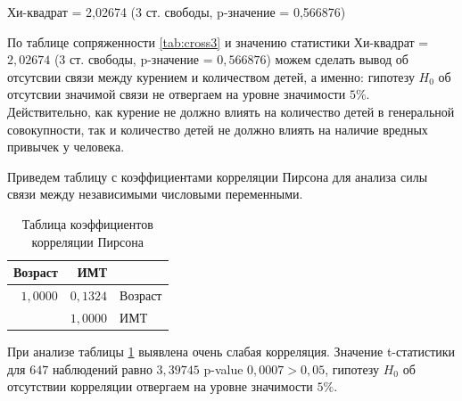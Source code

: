 \documentclass[a4paper,12pt]{article}
\begin{document}
Хи-квадрат = 2,02674 (3 ст. свободы, p-значение = 0,566876)

По таблице сопряженности \ref{tab:cross3} и значению статистики Хи-квадрат = $2,02674$ (3 ст. свободы, p-значение = $0,566876$) можем сделать вывод об отсутсвии связи между курением и количеством детей, а именно: гипотезу $H_0$ об отсутсвии значимой связи не отвергаем на уровне значимости $5\%$. Действительно, как курение не должно влиять на количество детей в генеральной совокупности, так и количество детей не должно влиять на наличие вредных привычек у человека.

Приведем таблицу с коэффициентами корреляции Пирсона для анализа силы связи между независимыми числовыми переменными. 

\begin{table}[H]
\begin{center}
	\vspace{8pt}
	\begin{tabular}{|r|r|l|}
		\hline
		Возраст & ИМТ &\\
		\hline
		$1,0000$ & $0,1324$ & Возраст\\
		\hline
		& $1,0000$ & ИМТ\\
		\hline
	\end{tabular}
	\caption{Таблица коэффициентов корреляции Пирсона}
	\label{tab:pris}
\end{center}
\end{table}

При анализе таблицы \ref{tab:pris} выявлена очень слабая корреляция. Значение t-статистики для $647$ наблюдений равно $3,39745$ p-value $0,0007 > 0,05$, гипотезу $H_0$ об отсутствии корреляции отвергаем на уровне значимости $5\%$.


\end{document}
